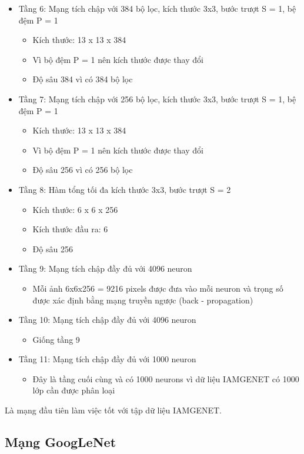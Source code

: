 \begin{itemize}
\begin{itemize}
\end{itemize}
\item Tầng 6: Mạng tích chập với 384 bộ lọc, kích thước 3x3, bước trượt S = 1, bệ đệm P = 1
\begin{itemize}
\item Kích thước: 13 x 13 x 384
\item Vì bộ đệm P = 1 nên kích thước được thay đổi
\item Độ sâu 384 vì có 384 bộ lọc
\end{itemize}
\item Tầng 7: Mạng tích chập với 256 bộ lọc, kích thước 3x3, bước trượt S = 1, bệ đệm P = 1
\begin{itemize}
\item Kích thước: 13 x 13 x 384
\item Vì bộ đệm P = 1 nên kích thước được thay đổi
\item Độ sâu 256 vì có 256 bộ lọc
\end{itemize}
\item Tầng 8: Hàm tổng tối đa kích thước 3x3, bước trượt S = 2
\begin{itemize}
\item Kích thước: 6 x 6 x 256
\item Kích thước đầu ra: 6
\item Độ sâu 256
\end{itemize}
\item Tầng 9: Mạng tích chập đầy đủ với 4096 neuron
\begin{itemize}
\item Mỗi ảnh 6x6x256 = 9216 pixels được đưa vào mỗi neuron và trọng số được xác định bằng mạng truyền ngược (back - propagation)
\end{itemize}
\item Tầng 10: Mạng tích chập đầy đủ với 4096 neuron
\begin{itemize}
\item Giống tầng 9
\end{itemize}
\item Tầng 11: Mạng tích chập đầy đủ với 1000 neuron
\begin{itemize}
\item Đây là tầng cuối cùng và có 1000 neurons vì dữ liệu IAMGENET có 1000 lớp cần được phân loại
\end{itemize}
\end{itemize}

Là mạng đầu tiên làm việc tốt với tập dữ liệu IAMGENET.
\subsection{Mạng GoogLeNet}

